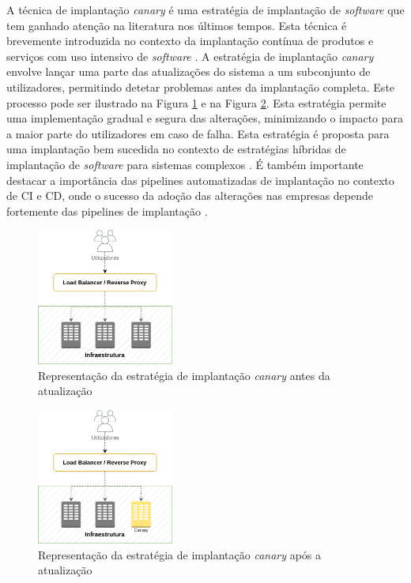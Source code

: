 A técnica de implantação \textit{canary} é uma estratégia de implantação de \textit{software} que 
tem ganhado atenção na literatura nos últimos tempos. Esta técnica é brevemente introduzida no 
contexto da implantação contínua de produtos e serviços com uso intensivo de \textit{software} \cite{canary2017}. 
A estratégia de implantação \textit{canary} envolve lançar uma parte das atualizações do sistema a 
um subconjunto de utilizadores, permitindo detetar problemas antes da implantação completa.
Este processo pode ser ilustrado na Figura \ref{fig:canary-before} e na Figura \ref{fig:canary-after}.
Esta estratégia permite uma implementação gradual e segura das alterações, minimizando o impacto 
para a maior parte do utilizadores em caso de falha. Esta estratégia é proposta para uma implantação 
bem sucedida no contexto de estratégias híbridas de implantação de \textit{software} para sistemas 
complexos \cite{canary2022}. É também importante destacar a importância das \glspl{pipeline} 
automatizadas de implantação no contexto de \ac{CI} e \ac{CD}, onde o sucesso da adoção das 
alterações nas empresas depende fortemente das \glspl{pipeline} de implantação 
\cite{canary2017b}. 

\begin{figure}[H]
    \centering
    \includegraphics[width=0.4\textwidth]{media/content/estado-arte/canary-before.png}
    \caption{Representação da estratégia de implantação \textit{canary} antes da atualização}
    \label{fig:canary-before}
\end{figure}

\begin{figure}[H]
    \centering
    \includegraphics[width=0.4\textwidth]{media/content/estado-arte/canary-after.png}
    \caption{Representação da estratégia de implantação \textit{canary} após a atualização}
    \label{fig:canary-after}
\end{figure}

